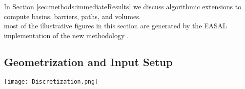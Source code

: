 \documentclass[]{article}
\begin{document}
In Section \ref{sec:methods:immediateResults} we discuss algorithmic extensions
to compute basins, barriers, paths, and volumes.\\

 most of the illustrative figures in this section are
generated by the EASAL implementation of the new methodology
\cite{easalSoftware,Ozkan:toms,easalVideo}.

\subsection{Geometrization and Input Setup}
\label{sec:geometrization}
\begin{figure*}[htpb]
\centering
\texttt{[image: Discretization.png]}
\caption{\scriptsize \textbf{Geometrization}: The short-range Lennard-Jones potential
function is discretized into 3 main regions. (1) Large pairwise inter-atomic 
distances at which no force is exerted between the atoms. Such atom pairs are 
called inactive constraints. (2) Small inter-atomic pairwise distances which 
are prohibited by the interatomic repulsion, which is called a collision.
(3) The interval between these, known as the well, in which stable interactions
or active constraints are formed.
$\varepsilon$ is the depth of the Lennard-Jones potential well and $\sigma$ is
the distance at which the interatomic force is zero.  
See Section \ref{sec:geometrization}.}
\label{fig:geometrization}
\end{figure*}
\end{document}

